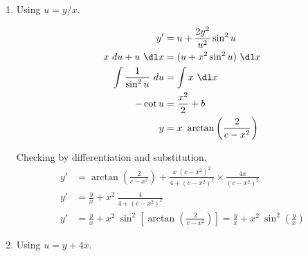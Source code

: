 \begin{enumerate}
    \item Using $u = y/x$.

          \begin{align}
              y'                            & = u + \frac{2 y^{2}}{u^{2}} \sin^{2} u        \\
              x\ du + u\ \dl x              & = (u + x^{2} \sin ^{2} u )\ \dl x             \\
              \int \frac{1}{\sin ^{2}u}\ du & = \int x\ \dl x                               \\
              - \cot u                      & = \frac{x^{2}}{2} + b                         \\
              y                             & = x\ \arctan \left(\frac{2}{c - x^{2}}\right)
          \end{align}
          \begin{figure}[H]
              \centering
          \end{figure}
          Checking by differentiation and substitution,
          \begin{align}
              y' & = \arctan \left(\frac{2}{c - x^{2}}\right) + \frac{x\ (c - x^{2})^{2}}{4 + (c - x^{2})^{2}} \times \frac{4x}{(c - x^{2})^{2}}                    \\
              y' & = \frac{y}{x} + x^{2}\ \frac{4}{4 + (c - x^{2})^{2}}                                                                                             \\
              y' & = \frac{y}{x} + x^{2} \ \sin ^{2} \left[\arctan\left(\frac{2}{c - x^{2}}\right)\right] = \frac{y}{x} + x^{2}\ \sin ^{2} \left(\frac{y}{x}\right)
          \end{align}


    \item Using $u = y + 4x$.


\end{enumerate}
